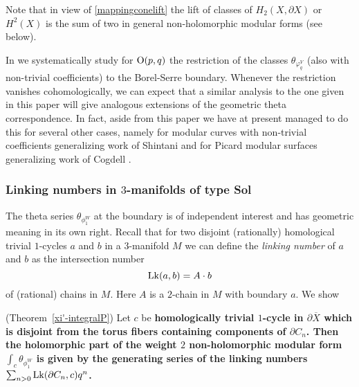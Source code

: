 Note that in view of \eqref{mappingconelift} the lift of classes of $H_2({X}, \partial {X})$ or $H^2(X)$ is the sum of two in general non-holomorphic modular forms (see below).

In \cite{FMres} we systematically study for $\operatorname{O}(p,q)$ the restriction of the classes $\theta_{\varphi^V_{q}}$ (also with non-trivial coefficients) to the Borel-Serre boundary. Whenever the restriction vanishes cohomologically, we can expect that a similar analysis to the one given in this paper will give analogous extensions of the geometric theta correspondence. In fact, aside from this paper we have at present managed to do this for several other cases, namely for modular curves with non-trivial coefficients \cite{FMspec} generalizing work of Shintani \cite{Shintani} and for Picard modular surfaces \cite{FM-Cogdell} generalizing work of Cogdell \cite{Cogdell}. 



\subsubsection*{Linking numbers in $3$-manifolds of type Sol}

The theta series $\theta_{\phi_1^W}$ at the boundary is of independent interest and has geometric meaning in its own right. Recall that for two disjoint (rationally) homological trivial $1$-cycles $a$ and $b$ in a $3$-manifold $M$ we can define the {\it linking number} of $a$ and $b$ as the intersection number 
\[
\operatorname{Lk}(a,b) = A \cdot b
\]
of (rational) chains in $M$. Here $A$ is a $2$-chain in $M$ with boundary $a$. We show 

\begin{theorem}\label{FM-linking} (Theorem~\ref{xi'-integralP})
Let $c$ be \bf{homologically} trivial $1$-cycle in $\partial \overline{X}$ which
is disjoint from the torus fibers containing components of $\partial C_n$. Then the holomorphic part of the weight $2$ non-holomorphic modular form $\int_c \theta_{\phi_1^W}$ is given by the generating series of the linking numbers $\sum_{n>0}\operatorname{Lk}(\partial C_n,c) q^n$.
\end{theorem}
